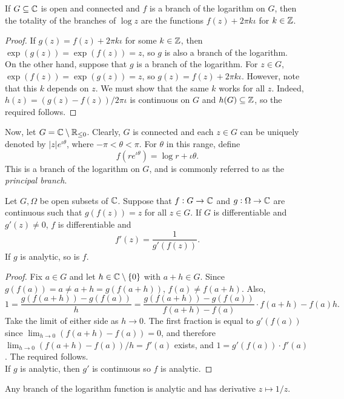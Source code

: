 	\begin{lemma}
		If $G \subseteq \mathbb{C}$ is open and connected and $f$ is a branch of the logarithm on $G$, then the totality of the branches of $\log z$ are the functions $f(z) + 2\pi k\iota$ for $k \in \mathbb{Z}$.
	\end{lemma}
	\begin{proof}
		If $g(z) = f(z) + 2\pi k\iota$ for some $k \in \mathbb{Z}$, then $\exp(g(z)) = \exp(f(z)) = z$, so $g$ is also a branch of the logarithm.\\
		On the other hand, suppose that $g$ is a branch of the logarithm. For $z\in G$, $\exp(f(z)) = \exp(g(z)) = z$, so $g(z) = f(z) + 2\pi k\iota$. However, note that this $k$ depends on $z$. We must show that the same $k$ works for all $z$. Indeed, $h(z) = (g(z) - f(z))/2\pi\iota$ is continuous on $G$ and $h(G) \subseteq \mathbb{Z}$, so the required follows.
	\end{proof}


	Now, let $G = \mathbb{C} \setminus \mathbb{R}_{\le 0}$. Clearly, $G$ is connected and each $z \in G$ can be uniquely denoted by $|z| e^{\iota\theta}$, where $-\pi < \theta < \pi$. For $\theta$ in this range, define
	\[ f(r e^{\iota\theta}) = \log r + \iota\theta. \]
	This is a branch of the logarithm on $G$, and is commonly referred to as the \emph{principal branch}.

	\begin{theorem}
		Let $G,\Omega$ be open subsets of $\mathbb{C}$. Suppose that $f : G \to \mathbb{C}$ and $g : \Omega \to \mathbb{C}$ are continuous such that $g(f(z)) = z$ for all $z \in G$. If $G$ is differentiable and $g'(z) \ne 0$, $f$ is differentiable and
		\[ f'(z) = \frac{1}{g'(f(z))}. \]
		If $g$ is analytic, so is $f$.
	\end{theorem}
	\begin{proof}
		Fix $a \in G$ and let $h \in \mathbb{C} \setminus \{0\}$ with $a+h \in G$. Since $g(f(a)) = a \ne a+h = g(f(a+h))$, $f(a) \ne f(a+h)$.
		Also,
		\[ 1 = \frac{g(f(a+h)) - g(f(a))}{h} = \frac{g(f(a+h)) - g(f(a))}{f(a+h)-f(a)} \cdot {f(a+h)-f(a)}{h}. \]
		Take the limit of either side as $h \to 0$. The first fraction is equal to $g'(f(a))$ since $\lim_{h\to 0} (f(a+h) - f(a)) = 0$, and therefore $\lim_{h\to0} (f(a+h) - f(a))/h = f'(a)$ exists, and $1 = g'(f(a)) \cdot f'(a)$. The required follows.\\
		If $g$ is analytic, then $g'$ is continuous so $f$ is analytic.
	\end{proof}

	\begin{corollary}
		Any branch of the logarithm function is analytic and has derivative $z \mapsto 1/z$.
	\end{corollary}


